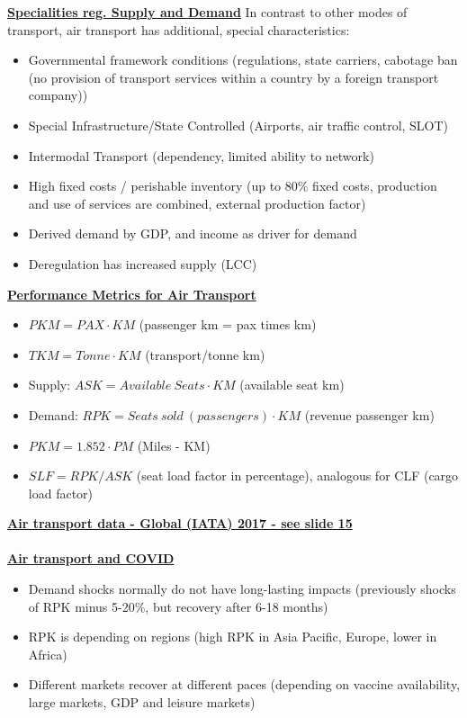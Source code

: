 \documentclass[9pt, landscape, fleqn]{scrartcl}
\begin{document}
\begin{multicols*}{3}
\underline{\textbf{Specialities reg. Supply and Demand}}
In contrast to other modes of transport, air transport has additional, special characteristics:
\begin{itemize}
    \item Governmental framework conditions (regulations, state carriers, cabotage ban (no provision of transport services within a country by a foreign transport company))
    \item Special Infrastructure/State Controlled (Airports, air traffic control, SLOT)
    \item Intermodal Transport (dependency, limited ability to network)
    \item High fixed costs / perishable inventory (up to 80\% fixed costs, production and use of services are combined, external production factor)
    \item Derived demand by GDP, and income as driver for demand
    \item Deregulation has increased supply (LCC)
\end{itemize}
\underline{\textbf{Performance Metrics for Air Transport}}
\begin{itemize}
    \item $PKM = PAX \cdot KM$ (passenger km = pax times km)
    \item $TKM = Tonne \cdot KM$ (transport/tonne km)
    \item Supply: $ASK = Available~Seats \cdot KM$ (available seat km)
    \item Demand: $RPK = Seats~sold~(passengers) \cdot KM$ (revenue passenger km)
    \item $PKM = 1.852\cdot PM$ (Miles - KM)
    \item $SLF = RPK / ASK$ (seat load factor in percentage), analogous for CLF (cargo load factor)
\end{itemize}
\underline{\textbf{Air transport data - Global (IATA) 2017 - see slide 15}} \\ \\
\underline{\textbf{Air transport and COVID}}
\begin{itemize}
    \item Demand shocks normally do not have long-lasting impacts (previously shocks of RPK minus 5-20\%, but recovery after 6-18 months)
    \item RPK is depending on regions (high RPK in Asia Pacific, Europe, lower in Africa)
    \item Different markets recover at different paces (depending on vaccine availability, large markets, GDP and leisure markets)

\end{itemize}
\end{multicols*}
\end{document}
